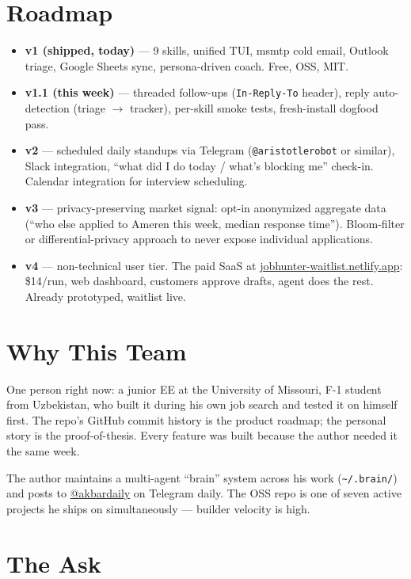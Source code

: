 \documentclass[11pt]{article}
\begin{document}
\section{Roadmap}

\begin{itemize}
  \item \textbf{v1 (shipped, today)} --- 9 skills, unified TUI, msmtp cold email, Outlook triage, Google Sheets sync, persona-driven coach. Free, OSS, MIT.
  \item \textbf{v1.1 (this week)} --- threaded follow-ups (\texttt{In-Reply-To} header), reply auto-detection (triage \(\to\) tracker), per-skill smoke tests, fresh-install dogfood pass.
  \item \textbf{v2} --- scheduled daily standups via Telegram (\texttt{@aristotlerobot} or similar), Slack integration, ``what did I do today / what's blocking me'' check-in. Calendar integration for interview scheduling.
  \item \textbf{v3} --- privacy-preserving market signal: opt-in anonymized aggregate data (``who else applied to Ameren this week, median response time''). Bloom-filter or differential-privacy approach to never expose individual applications.
  \item \textbf{v4} --- non-technical user tier. The paid SaaS at \href{https://jobhunter-waitlist.netlify.app}{jobhunter-waitlist.netlify.app}: \$14/run, web dashboard, customers approve drafts, agent does the rest. Already prototyped, waitlist live.
\end{itemize}

\section{Why This Team}

One person right now: a junior EE at the University of Missouri, F-1 student from Uzbekistan, who built it during his own job search and tested it on himself first. The repo's GitHub commit history is the product roadmap; the personal story is the proof-of-thesis. Every feature was built because the author needed it the same week.

The author maintains a multi-agent ``brain'' system across his work (\texttt{\textasciitilde/.brain/}) and posts to \href{https://t.me/akbardaily}{@akbardaily} on Telegram daily. The OSS repo is one of seven active projects he ships on simultaneously --- builder velocity is high.

\section{The Ask}
\end{document}
